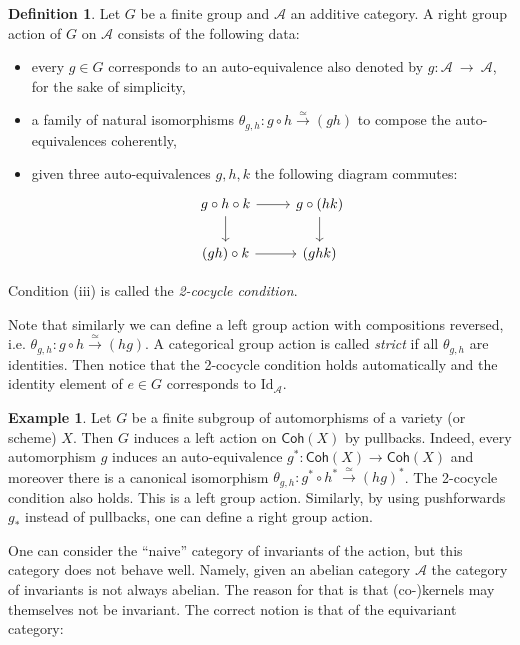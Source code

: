 \documentclass[10pt]{amsart}
\theoremstyle{definition}
\newtheorem{example}[theorem]{Example}
\newtheorem{definition}[theorem]{Definition}
\begin{document}
\begin{definition}{\label{def:catactions}}
Let $G$ be a finite group and $\mathcal{A}$ an additive category.
A right group action of $G$ on $\mathcal{A}$ consists of the following data:
\begin{itemize}
\item[(i)] every $g \in G$ corresponds to an auto-equivalence also denoted by $g \colon \mathcal{A}~\to~\mathcal{A}$, for the sake of simplicity,
\item[(ii)] a family of natural isomorphisms $\theta_{g,h} \colon g \circ h \xrightarrow{\simeq} (gh)$ to compose the auto-equivalences coherently,
\item[(iii)] given three auto-equivalences $g,h,k$ the following diagram commutes:
\begin{equation*}\label{cocycle}
\begin{tikzcd}
g \circ h \circ k \arrow[r] \arrow[d] & g\circ (hk) \arrow[d] \\
(gh)\circ k \arrow[r] & (ghk)
\end{tikzcd}
 \end{equation*}
\end{itemize}
Condition (iii) is called the \textit{2-cocycle condition}.
\end{definition}

Note that similarly we can define a left group action with compositions reversed, i.e. $\theta_{g,h} \colon g \circ h \xrightarrow{\simeq} (hg)$. A categorical group action is called {\em strict} if all $\theta_{g,h}$ are identities. Then notice that the 2-cocycle condition holds automatically and the identity element of $e \in G$ corresponds to $\mathrm{Id}_{\mathcal{A}}$.

\begin{example}\label{actiononcoh1}
 Let $G$ be a finite subgroup of automorphisms of a variety (or scheme) $X$. Then $G$ induces a left action on $\mathsf{Coh}(X)$ by pullbacks. Indeed, every automorphism $g$ induces an auto-equivalence $g^*\colon \mathsf{Coh}(X) \to \mathsf{Coh}(X)$ and moreover there is a canonical isomorphism $\theta_{g,h} \colon g^* \circ h^* \xrightarrow{\simeq} (hg)^*$. The 2-cocycle condition also holds. This is a left group action. Similarly, by using pushforwards $g_*$ instead of pullbacks, one can define a right group action.
\end{example}

One can consider the ``naive'' category of invariants of the action, but this category does not behave well. Namely, given an abelian category $\mathcal{A}$ the category of invariants is not always abelian. The reason for that is that (co-)kernels may themselves not be invariant. The correct notion is that of the equivariant category:
\end{document}
